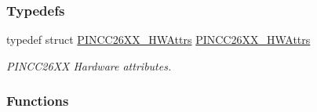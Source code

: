 \subsubsection*{Typedefs}
\begin{DoxyCompactItemize}
\item 
typedef struct \hyperlink{struct_p_i_n_c_c26_x_x___h_w_attrs}{P\+I\+N\+C\+C26\+X\+X\+\_\+\+H\+W\+Attrs} \hyperlink{_p_i_n_c_c26_x_x_8h_ab5e14c623ee19df328043d474fa8e0d9}{P\+I\+N\+C\+C26\+X\+X\+\_\+\+H\+W\+Attrs}
\begin{DoxyCompactList}\small\item\em P\+I\+N\+C\+C26\+X\+X Hardware attributes. \end{DoxyCompactList}\end{DoxyCompactItemize}
\subsubsection*{Functions}
